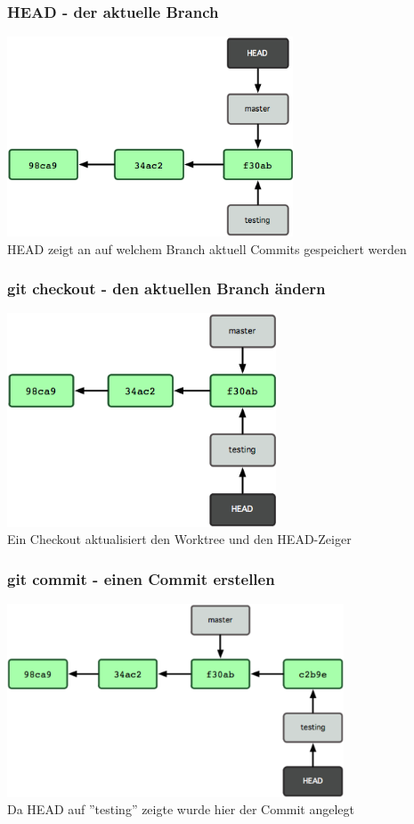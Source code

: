 \begin{frame}
  \frametitle{HEAD - der aktuelle Branch}
  \begin{center}
    \includegraphics[width=8.5cm]{img/headref.png} \\
    HEAD zeigt an auf welchem Branch aktuell Commits gespeichert werden
  \end{center}
\end{frame}

\begin{frame}
  \frametitle{git checkout - den aktuellen Branch ändern}
  \begin{center}
    \includegraphics[width=8cm]{img/headref_changed.png} \\
    Ein Checkout aktualisiert den Worktree und den HEAD-Zeiger
  \end{center}
\end{frame}

\begin{frame}
  \frametitle{git commit - einen Commit erstellen}
  \begin{center}
    \includegraphics[width=10cm]{img/new_commit.png} \\
    Da HEAD auf ''testing'' zeigte wurde hier der Commit angelegt
  \end{center}
\end{frame}

